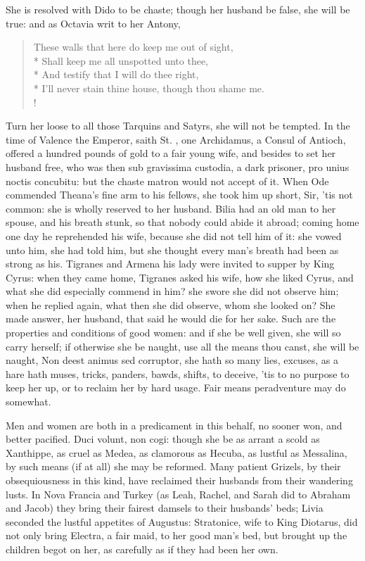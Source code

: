 She is resolved with Dido to be chaste; though her husband be false,
she will be true: and as Octavia writ to her Antony,
%
\begin{verse}%
These walls that here do keep me out of sight,\\*
Shall keep me all unspotted unto thee,\\*
And testify that I will do thee right,\\*
I'll never stain thine house, though thou shame me.\\!
\end{verse}%
%
Turn her loose to all those Tarquins and Satyrs, she will not be
tempted. In the time of Valence the Emperor, saith St. \Austin{},
one Archidamus, a Consul of Antioch, offered a hundred pounds of gold
to a fair young wife, and besides to set her husband free, who was then
sub gravissima custodia, a dark prisoner, pro unius noctis concubitu:
but the chaste matron would not accept of it. When Ode commended
Theana's fine arm to his fellows, she took him up short, Sir, 'tis not
common: she is wholly reserved to her husband. Bilia had an old
man to her spouse, and his breath stunk, so that nobody could abide it
abroad; coming home one day he reprehended his wife, because she did
not tell him of it: she vowed unto him, she had told him, but she
thought every man's breath had been as strong as his. Tigranes
and Armena his lady were invited to supper by King Cyrus: when they
came home, Tigranes asked his wife, how she liked Cyrus, and what she
did especially commend in him? she swore she did not observe him; when
he replied again, what then she did observe, whom she looked on? She
made answer, her husband, that said he would die for her sake. Such are
the properties and conditions of good women: and if she be well given,
she will so carry herself; if otherwise she be naught, use all the
means thou canst, she will be naught, Non deest animus sed corruptor,
she hath so many lies, excuses, as a hare hath muses, tricks, panders,
bawds, shifts, to deceive, 'tis to no purpose to keep her up, or to
reclaim her by hard usage. Fair means peradventure may do somewhat.

  Men and women are both in a
predicament in this behalf, no sooner won, and better pacified. Duci
volunt, non cogi: though she be as arrant a scold as Xanthippe, as
cruel as Medea, as clamorous as Hecuba, as lustful as Messalina, by
such means (if at all) she may be reformed. Many patient Grizels,
by their obsequiousness in this kind, have reclaimed their husbands
from their wandering lusts. In Nova Francia and Turkey (as Leah,
Rachel, and Sarah did to Abraham and Jacob) they bring their fairest
damsels to their husbands' beds; Livia seconded the lustful appetites
of Augustus: Stratonice, wife to King Diotarus, did not only bring
Electra, a fair maid, to her good man's bed, but brought up the
children begot on her, as carefully as if they had been her own.

